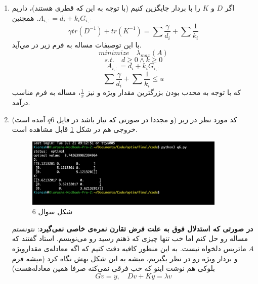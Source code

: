 \begin{enumerate}
	\item 
اگر $D$ و $K$ را با بردار جایگزین کنیم (با توجه به این که قطری هستند)، داریم
$A_{i,:} = d_i + k_iG_{i,:}$.
همچنین
\[
\gamma tr(D^{-1}) + tr(K^{-1}) = \sum \frac{\gamma}{d_i} + \sum \frac{1}{k_i}
\]
با این توصیفات مساله به فرم زیر در مي‌آید.\\
\[
minimize \quad \lambda_{max}(A)
\]\[
s.t. \quad d \ge 0 \land k \ge 0\]\[
A_{i,:} = d_i + k_iG_{i,:}\]\[
\sum \frac{\gamma}{d_i} + \sum \frac{1}{k_i} \le u
\]
که با توجه به محدب بودن بزرگترین مقدار ویژه و نیز $\frac{1}{x}$، مساله به فرم مناسب درآمد.
\item 
کد مورد نظر در زیر (و مجددا در صورتی که نیاز باشد در فایل $q6$ آمده است) خروجی هم در شکل
\ref{fig:6}
قابل مشاهده است.
\begin{latin}
	
\end{latin}
\begin{figure}[H]
	\centering
	\includegraphics[width=0.9\textwidth]{q6}
	\caption{شکل سوال 6}
	\label{fig:6}
\end{figure}
\textbf{در صورتی که استدلال فوق به علت فرض تقارن نمره‌ی خاصی نمی‌گیرد}:
نتونستم مساله رو حل کنم اما خب تنها چیزی که ذهنم رسید رو می‌نویسم. استاد گفتند که $A$ ماتریس دلخواه نیست. به این منظور کافیه دقت کنیم که اگه معادله‌ی مقدارویژه و بردار ویژه رو در نظر بگیریم، میشه به این شکل بهش نگاه کرد (میشه فرم بلوکی هم نوشت اینو که خب فرقی نمی‌کنه صرفا همین معادله‌هست)
\[
Gv = y, \quad Dv + Ky = \lambda v
\]
\end{enumerate}